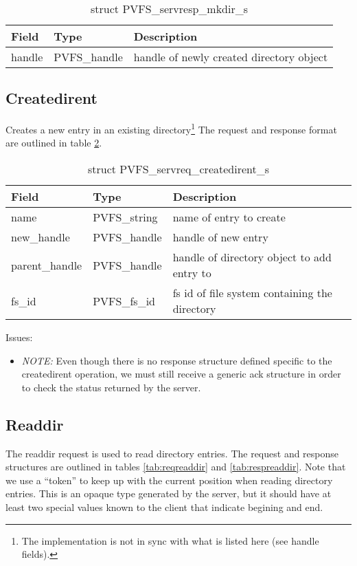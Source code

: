 \documentclass[11pt, letterpaper]{article} %
\begin{document}
\begin{table}[H]
\begin{tabular}{|l|l|l|}
\hline
Field & Type & Description \\
\hline
\hline
handle & PVFS\_handle & handle of newly created directory object\\
\hline
\end{tabular}
\caption{struct PVFS\_servresp\_mkdir\_s \label{tab:respmkdir}}
\end{table}

\subsection{Createdirent}

Creates a new entry in an existing directory\footnote{The implementation
is not in sync with what is listed here (see handle fields).}   The request and response
format are outlined in table \ref{tab:reqcreatedirent}.

\begin{table}[H]
\begin{tabular}{|l|l|l|}
\hline
Field & Type & Description \\
\hline
\hline
name & PVFS\_string & name of entry to create\\
\hline
new\_handle & PVFS\_handle & handle of new entry\\
\hline
parent\_handle & PVFS\_handle & handle of directory object to add entry to\\
\hline
fs\_id & PVFS\_fs\_id & fs id of file system containing the directory\\
\hline
\end{tabular}
\caption{struct PVFS\_servreq\_createdirent\_s \label{tab:reqcreatedirent}}
\end{table}

Issues:
\begin{itemize}
\item \emph{NOTE:}  Even though there is no response structure defined specific
to the createdirent operation, we must still receive a generic ack
structure in order to check the status returned by the server.
\end{itemize}

\subsection{Readdir}

The readdir request is used to read directory entries.  The request and
response structures are outlined in tables \ref{tab:reqreaddir} and
\ref{tab:respreaddir}.  Note that we use a ``token'' to keep up with the
current position when reading directory entries.  This is an opaque type
generated by the server, but it should have at least two special values
known to the client that indicate begining and end.
\end{document}

